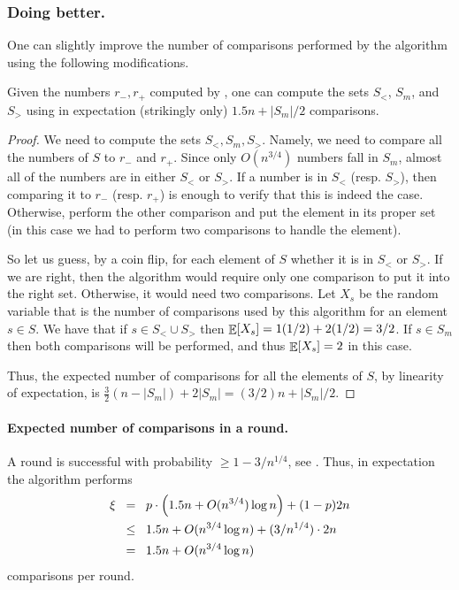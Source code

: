 \subsubsection{Doing better.}

One can slightly improve the number of comparisons performed by the
algorithm using the following modifications.
\begin{lemma}
    Given the numbers $r_{-}, r_{+}$ computed by ,
    one can compute the sets $S_<$, $S_m$, and $S_>$ using in expectation
    (strikingly only) $1.5n + |S_m|/2$ comparisons.
\end{lemma}
\begin{proof}
    We need to compute the sets $S_{<}, S_m, S_>$. Namely, we need to
    compare all the numbers of $S$ to $r_{-}$ and $r_{+}$. Since only
    $O(n^{3/4})$ numbers fall in $S_m$, almost all of the numbers are in
    either $S_<$ or $S_>$. If a number is in $S_<$ (resp. $S_>$), then
    comparing it to $r_-$ (resp. $r_+$) is enough to verify that this is
    indeed the case. Otherwise, perform the other comparison and put the
    element in its proper set (in this case we had to perform two
    comparisons to handle the element).

    So let us guess, by a coin flip, for each element of $S$ whether it
    is in $S_<$ or $S_>$. If we are right, then the algorithm would
    require only one comparison to put it into the right set. Otherwise,
    it would need two comparisons. Let $X_s$ be the random variable that
    is the number of comparisons used by this algorithm for an element
    $s \in S$. We have that if $s \in S_< \cup S_>$ then
    $\mathop{\mathbb{E}}\!\left[ {X_s} \right] = 1(1/2) + 2(1/2) = 3/2$. If $s \in S_m$ then both
    comparisons will be performed, and thus $\mathop{\mathbb{E}}\!\left[ {X_s} \right]=2$ in this case.

    Thus, the expected number of comparisons for all the elements of $S$,
    by linearity of expectation, is
    $\tfrac{3}{2}(n-|S_m|) + 2 |S_m| = (3/2)n + |S_m|/2$.
\end{proof}


\paragraph*{Expected number of comparisons in a round.}
A round is successful with probability
$\geq 1- 3/n^{1/4}$, see . Thus, in expectation the
algorithm performs
\begin{align*}
    \xi
    &\mathrel{\;\;=\;\;}
    p\cdot \Bigl(1.5n + O(n^{3/4}) \log n \Bigr) + (1-p)2n
    \\&
    \mathrel{\;\;\leq\;\;}
    1.5n +  O(n^{3/4} \log n) + (3/n^{1/4}) \cdot 2n
    \\&
    \mathrel{\;\;=\;\;}
    1.5n + O(n^{3/4} \log n)
\end{align*}
comparisons per round. 



